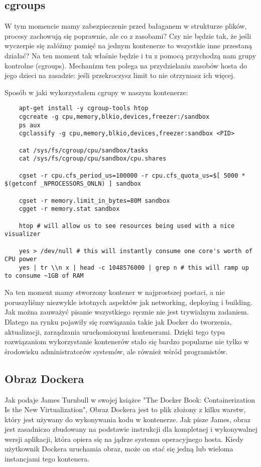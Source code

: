 \subsection{cgroups}
W tym momencie mamy zabezpieczenie przed bałaganem w strukturze plików, procesy zachowują się poprawnie, ale co z zasobami? Czy nie będzie tak, że jeśli wyczerpie się załóżmy pamięć na jednym kontenerze to wszystkie inne przestaną działać? Na ten moment tak właśnie będzie i tu z pomocą przychodzą nam grupy kontrolne (cgroups). Mechanizm ten polega na przydzielaniu zasobów hosta do jego dzieci na zasadzie: jeśli przekroczysz limit to nie otrzymasz ich więcej. 

Sposób w jaki wykorzystałem cgrupy w naszym kontenerze: 

\begin{lstlisting}
    apt-get install -y cgroup-tools htop
    cgcreate -g cpu,memory,blkio,devices,freezer:/sandbox
    ps aux 
    cgclassify -g cpu,memory,blkio,devices,freezer:sandbox <PID>

    cat /sys/fs/cgroup/cpu/sandbox/tasks
    cat /sys/fs/cgroup/cpu/sandbox/cpu.shares

    cgset -r cpu.cfs_period_us=100000 -r cpu.cfs_quota_us=$[ 5000 * $(getconf _NPROCESSORS_ONLN) ] sandbox

    cgset -r memory.limit_in_bytes=80M sandbox
    cgget -r memory.stat sandbox

    htop # will allow us to see resources being used with a nice visualizer

    yes > /dev/null # this will instantly consume one core's worth of CPU power
    yes | tr \\n x | head -c 1048576000 | grep n # this will ramp up to consume ~1GB of RAM
\end{lstlisting}
Na ten moment mamy stworzony kontener w najprostszej postaci, a nie poruszyliśmy niezwykle istotnych aspektów jak networking, deploying i building. 
Jak można zauważyć pisanie wszystkiego ręcznie nie jest trywialnym zadaniem. Dlatego na rynku pojawiły się rozwiązania takie jak Docker do tworzenia, aktualizacji, zarządzania uruchomionymi kontenerami. Dzięki tego typu rozwiązaniom wykorzystanie kontenerów stało się bardzo popularne nie tylko w środowisku administratorów systemów, ale również wśród programistów. 
\subsection{Obraz Dockera}
Jak podaje James Turnbull w swojej książce "The Docker Book: Containerization Is the New Virtualization", Obraz Dockera jest to plik złożony z kilku warstw, który jest używany do wykonywania kodu w kontenerze. Jak pisze James, obraz jest zasadniczo zbudowany na podstawie instrukcji dla kompletnej i wykonywalnej wersji aplikacji, która opiera się na jądrze systemu operacyjnego hosta. Kiedy użytkownik Dockera uruchamia obraz, może on stać się jedną lub wieloma instancjami tego kontenera.
